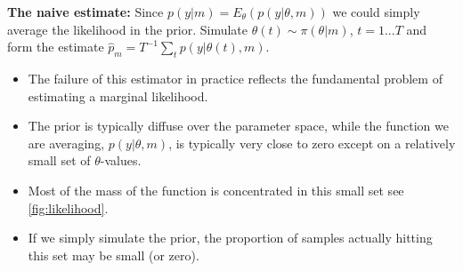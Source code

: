 \documentclass{article}
\begin{document}
\textbf{The naive estimate:} Since \( p(y|m) = E_\theta(p(y|\theta, m)) \) we could simply average the likelihood in the prior. Simulate \( \theta(t) \sim \pi(\theta|m) \), \( t = 1...T \) and form the estimate \( \hat{p}_m = T^{-1} \sum_{t} p(y|\theta(t), m) \).

\begin{itemize}
    \item The failure of this estimator in practice reflects the fundamental problem of estimating a marginal likelihood.
    \item The prior is typically diffuse over the parameter space, while the function we are averaging, \( p(y|\theta, m) \), is typically very close to zero except on a relatively small set of \( \theta \)-values.
    \item Most of the mass of the function is concentrated in this small set see \ref{fig:likelihood}.
    \item If we simply simulate the prior, the proportion of samples actually hitting this set may be small (or zero).
\end{itemize}
\end{document}

